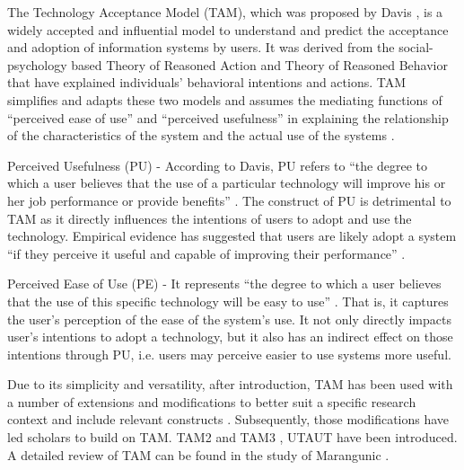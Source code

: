 \documentclass[a4paper,12pt]{article}
\newcommand{\citeyearonly}[1]{\citeyearpar{#1}}
\begin{document}
The Technology Acceptance Model (TAM), which was proposed by Davis \citeyearonly{davis1985technology}, is a widely accepted and influential model to understand and predict the acceptance and adoption of information systems by users. It was derived from the social-psychology based Theory of Reasoned Action and Theory of Reasoned Behavior that have explained individuals' behavioral intentions and actions. TAM simplifies and adapts these two models and assumes the mediating functions of ``perceived ease of use'' and ``perceived usefulness'' in explaining the relationship of the characteristics of the system and the actual use of the systems \citep{marangunic2015technology}. 

Perceived Usefulness (PU) - According to Davis, PU refers to ``the degree to which a user believes that the use of a particular technology will improve his or her job performance or provide benefits'' \citep{davis1985technology}. The construct of PU is detrimental to TAM as it directly influences the intentions of users to adopt and use the technology. Empirical evidence has suggested that users are likely adopt a system ``if they perceive it useful and capable of improving their performance'' \citep{davis1985technology}.

Perceived Ease of Use (PE) - It represents ``the degree to which a user believes that the use of this specific technology will be easy to use'' \citep{davis1985technology}. That is, it captures the user's perception of the ease of the system's use. It not only directly impacts user's intentions to adopt a technology, but it also has an indirect effect on those intentions through PU, i.e. users may perceive easier to use systems more useful.  

Due to its simplicity and versatility, after introduction, TAM has been used with a number of extensions and modifications to better suit a specific research context and include relevant constructs \citep{featherman2003predictingextension, amoako2004extension, burton2006mediationextension}. Subsequently, those modifications have led scholars to build on TAM. TAM2 \citep{venkateshDeterminantsPerceivedEase2000} and TAM3 \citep{venkateshTechnologyAcceptanceModel2008}, UTAUT \citep{venkatesh2003utaut} have been introduced. A detailed review of TAM can be found in the study of Marangunic \citeyearonly{marangunic2015technology}.
\end{document}
